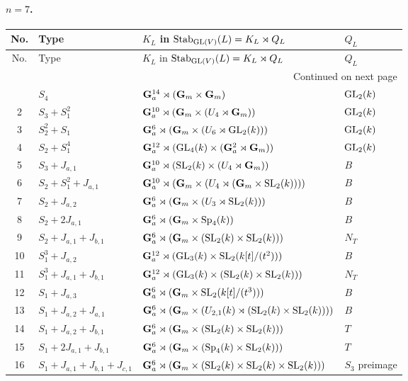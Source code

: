 \paragraph{$n=7$.}
\begin{longtable}{@{}c p{} p{} p{}@{}}
\toprule
No. & Type & $K_L$ in $\mathrm{Stab}_{\mathrm{GL}(V)}(L)=K_L\rtimes Q_L$ & $Q_L$ \\
\midrule
\endfirsthead
\toprule
No. & Type & $K_L$ in $\mathrm{Stab}_{\mathrm{GL}(V)}(L)=K_L\rtimes Q_L$ & $Q_L$ \\
\midrule
\endhead
\midrule
\multicolumn{4}{r}{Continued on next page}\\
\midrule
\endfoot
\bottomrule
\endlastfoot
1 & \(S_4\) & $\mathbf G_a^{14}\rtimes (\mathbf G_m\times \mathbf G_m)$ & $\mathrm{GL}_2(k)$ \\
2 & \(S_3 + S_1^2\) & $\mathbf G_a^{10}\rtimes (\mathbf G_m\times (U_4\rtimes \mathbf G_m))$ & $\mathrm{GL}_2(k)$ \\
3 & \(S_2^2 + S_1\) & $\mathbf G_a^6\rtimes (\mathbf G_m\times (U_6\rtimes \mathrm{GL}_2(k)))$ & $\mathrm{GL}_2(k)$ \\
4 & \(S_2 + S_1^4\) & $\mathbf G_a^{12}\rtimes (\mathrm{GL}_4(k)\times (\mathbf G_a^2\rtimes \mathbf G_m))$ & $\mathrm{GL}_2(k)$ \\
5 & \(S_3 + J_{a,1}\) & $\mathbf G_a^{10}\rtimes (\mathrm{SL}_2(k)\times (U_4\rtimes \mathbf G_m))$ & $B$ \\
6 & \(S_2 + S_1^2 + J_{a,1}\) & $\mathbf G_a^{10}\rtimes (\mathbf G_m\times (U_4\rtimes (\mathbf G_m\times \mathrm{SL}_2(k))))$ & $B$ \\
7 & \(S_2 + J_{a,2}\) & $\mathbf G_a^6\rtimes (\mathbf G_m\times (U_3\rtimes \mathrm{SL}_2(k)))$ & $B$ \\
8 & \(S_2 + 2J_{a,1}\) & $\mathbf G_a^6\rtimes (\mathbf G_m\times \mathrm{Sp}_4(k))$ & $B$ \\
9 & \(S_2 + J_{a,1} + J_{b,1}\) & $\mathbf G_a^6\rtimes (\mathbf G_m\times (\mathrm{SL}_2(k)\times \mathrm{SL}_2(k)))$ & $N_T$ \\
10 & \(S_1^3 + J_{a,2}\) & $\mathbf G_a^{12}\rtimes (\mathrm{GL}_3(k)\times \mathrm{SL}_2(k[t]/(t^2)))$ & $B$ \\
11 & \(S_1^3 + J_{a,1} + J_{b,1}\) & $\mathbf G_a^{12}\rtimes (\mathrm{GL}_3(k)\times (\mathrm{SL}_2(k)\times \mathrm{SL}_2(k)))$ & $N_T$ \\
12 & \(S_1 + J_{a,3}\) & $\mathbf G_a^6\rtimes (\mathbf G_m\times \mathrm{SL}_2(k[t]/(t^3)))$ & $B$ \\
13 & \(S_1 + J_{a,2} + J_{a,1}\) & $\mathbf G_a^6\rtimes (\mathbf G_m\times (U_{2,1}(k)\rtimes (\mathrm{SL}_2(k)\times \mathrm{SL}_2(k))))$ & $B$ \\
14 & \(S_1 + J_{a,2} + J_{b,1}\) & $\mathbf G_a^6\rtimes (\mathbf G_m\times (\mathrm{SL}_2(k)\times \mathrm{SL}_2(k)))$ & $T$ \\
15 & \(S_1 + 2J_{a,1} + J_{b,1}\) & $\mathbf G_a^6\rtimes (\mathbf G_m\times (\mathrm{Sp}_4(k)\times \mathrm{SL}_2(k)))$ & $T$ \\
16 & \(S_1 + J_{a,1} + J_{b,1} + J_{c,1}\) & $\mathbf G_a^6\rtimes (\mathbf G_m\times (\mathrm{SL}_2(k)\times \mathrm{SL}_2(k)\times \mathrm{SL}_2(k)))$ & $S_3$ preimage \\
\end{longtable}
